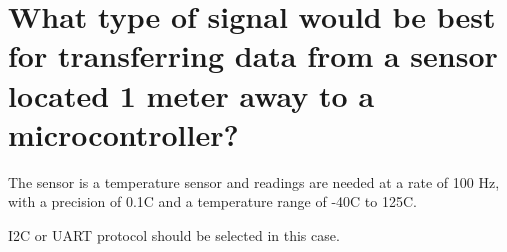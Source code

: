 \documentclass[main.tex]{subfiles}
\begin{document}
\section{What type of signal would be best for transferring data from a sensor located 1 meter away to a microcontroller?} 
The sensor is a temperature sensor and readings are needed at a rate of 100 Hz, with a precision of 0.1C and a temperature range of -40C to 125C. %

\spoilerline

\noindent I2C or UART protocol should be selected in this case. %
\end{document}

